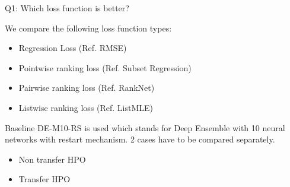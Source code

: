 \documentclass{beamer}
\begin{document}
\begin{frame}[t]{Q1: Which loss function is better?}

We compare the following loss function types:
\begin{itemize}
\item Regression Loss (Ref.  RMSE)
\item Pointwise ranking loss (Ref.  Subset Regression)
\item Pairwise ranking loss (Ref.  RankNet)
\item Listwise ranking loss (Ref.  ListMLE)
\end{itemize}
Baseline DE-M10-RS is used which stands for Deep Ensemble with 10 neural networks with restart mechanism.
2 cases have to be compared separately.
\begin{itemize}
\item Non transfer HPO
\item Transfer HPO
\end{itemize}


\end{frame}
\end{document}
